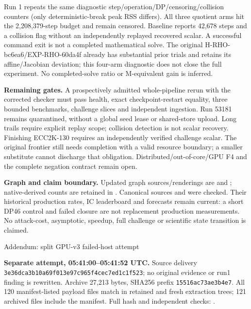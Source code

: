 \documentclass[10pt]{article}
\begin{document}
Run 1 repeats the same diagnostic step/operation/DP/censoring/collision counters
(only deterministic-break peak RSS differs). All three quotient arms hit the
2,208,379-step budget and remain censored. Baseline reports 42,678 steps and
a collision flag without an independently replayed recovered scalar.
A successful command exit is not a completed mathematical solve. The original
H-RHO-bc6ea6/EXP-RHO-60da4f already has substantial prior trials and retains
its affine/Jacobian deviation; this four-arm diagnostic does not close the
full experiment. No completed-solve ratio or M-equivalent gain is inferred.

\textbf{Remaining gates.} A prospectively admitted whole-pipeline rerun with
the corrected checker must pass health, exact checkpoint-restart equality,
three bounded benchmarks, challenge slices and independent ingestion.
Run 53181 remains quarantined, without a global seed lease or shared-store
upload. Long trails require explicit replay scope; collision detection is
not scalar recovery. Finishing ECC2K-130 requires an independently verified
challenge scalar. The original frontier still needs completion with a valid
resource boundary; a smaller substitute cannot discharge that obligation.
Distributed/out-of-core/GPU F4 and the complete negation contract remain open.

\textbf{Graph and claim boundary.} Updated graph sources/renderings are
 and ; native-derived
counts are retained in . Canonical sources
 and
 were checked. Their historical production rates,
IC leaderboard and forecasts remain current: a short DP46 control and failed
closure are not replacement production measurements. No attack-cost,
asymptotic, speedup, full challenge or scientific state transition is claimed.

\newpage
\begin{center}\large Addendum: split GPU-v3 failed-host attempt\end{center}
\textbf{Separate attempt, 05:41:00--05:41:52 UTC.} Source delivery
\texttt{3e36dca3b10a69f013e97c965f4cec7ed1c1f523}; no original evidence or
run1 finding is rewritten. Archive 27,213 bytes, SHA256 prefix
\texttt{15516ac73ae3b4e7}. All 120 manifest-listed payload files match in
retained and fresh extraction trees; 121 archived files include the manifest.
Full hash and independent checks: .
\end{document}
